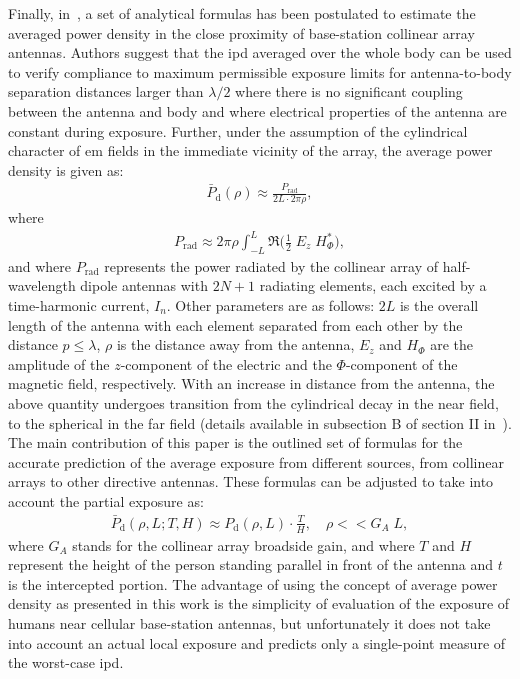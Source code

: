 Finally, in~\cite{Faraone2000Estimation}, a set of analytical formulas has been postulated to estimate the averaged power density in the close proximity of base-station collinear array antennas.
Authors suggest that the \gls{ipd} averaged over the whole body can be used to verify compliance to maximum permissible exposure limits for antenna-to-body separation distances larger than $\lambda/2$ where there is no significant coupling between the antenna and body and where electrical properties of the antenna are constant during exposure.
Further, under the assumption of the cylindrical character of \gls{em} fields in the immediate vicinity of the array, the average power density is given as:
\begin{align}
    \bar{P}_\text{d}(\rho) \approx \frac{P_\text{rad}}{2L \cdot 2\pi\rho},
\end{align}
where
\begin{align}
    P_\text{rad} \approx 2\pi\rho \int_{-L}^{L} \Re \Big( \frac{1}{2} \; E_z \; H_\Phi^* \Big),
\end{align}
and where $P_\text{rad}$ represents the power radiated by the collinear array of half-wavelength dipole antennas with $2N +1$ radiating elements, each excited by a time-harmonic current, $I_n$.
Other parameters are as follows: $2L$ is the overall length of the antenna with each element separated from each other by the distance $p \leq \lambda$, $\rho$ is the distance away from the antenna, $E_z$ and $H_\Phi$ are the amplitude of the $z$-component of the electric and the $\Phi$-component of the magnetic field, respectively.
With an increase in distance from the antenna, the above quantity undergoes transition from the cylindrical decay in the near field, to the spherical in the far field (details available in subsection B of section II in~\cite{Faraone2000Estimation}).
The main contribution of this paper is the outlined set of formulas for the accurate prediction of the average exposure from different sources, from collinear arrays to other directive antennas.
These formulas can be adjusted to take into account the partial exposure as:
\begin{align}
    \bar{P}_\text{d}(\rho, L; T, H) \approx P_\text{d}(\rho, L) \cdot \frac{T}{H}, \quad \rho << G_A \; L,
\end{align}
where $G_A$ stands for the collinear array broadside gain, and where $T$ and $H$ represent the height of the person standing parallel in front of the antenna and $t$ is the intercepted portion.
The advantage of using the concept of average power density as presented in this work is the simplicity of evaluation of the exposure of humans near cellular base-station antennas, but unfortunately it does not take into account an actual local exposure and predicts only a single-point measure of the worst-case \gls{ipd}.

